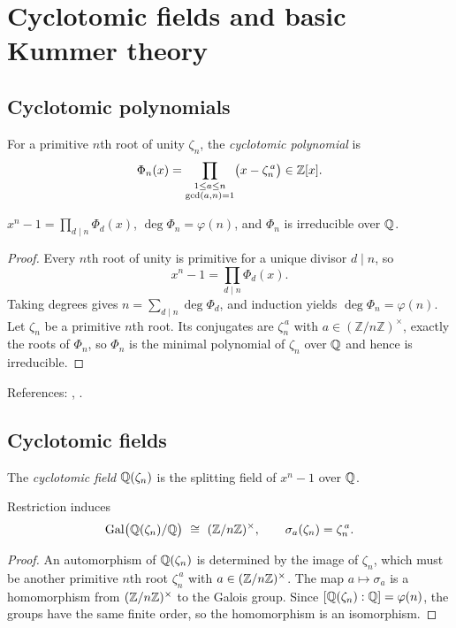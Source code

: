 \section{Cyclotomic fields and basic Kummer theory}\label{sec:cyclotomic-kummer}

\subsection{Cyclotomic polynomials}
\begin{definition}
For a primitive $n$th root of unity $\zeta_n$, the \emph{cyclotomic polynomial} is
\[
\Phi_n(x)=\prod_{\substack{1\le a\le n\\ \gcd(a,n)=1}}\bigl(x-\zeta_n^{\,a}\bigr)\in\mathbb{Z}[x].
\]
\end{definition}
\begin{theorem}
$x^n-1=\prod_{d\mid n}\Phi_d(x)$, $\deg\Phi_n=\varphi(n)$, and $\Phi_n$ is irreducible over $\mathbb{Q}$.
\end{theorem}
\begin{proof}
Every $n$th root of unity is primitive for a unique divisor $d\mid n$, so
\[x^n-1=\prod_{d\mid n}\Phi_d(x).\]
Taking degrees gives $n=\sum_{d\mid n}\deg\Phi_d$, and induction yields $\deg\Phi_n=\varphi(n)$. Let $\zeta_n$ be a primitive $n$th root. Its conjugates are $\zeta_n^{\,a}$ with $a\in(\mathbb{Z}/n\mathbb{Z})^\times$, exactly the roots of $\Phi_n$, so $\Phi_n$ is the minimal polynomial of $\zeta_n$ over $\mathbb{Q}$ and hence is irreducible.
\end{proof}
References: \cite[\S13]{DF}, \cite[Ch.~VIII]{Lang}.

\subsection{Cyclotomic fields}
\begin{definition}
The \emph{cyclotomic field} $\mathbb{Q}(\zeta_n)$ is the splitting field of $x^n-1$ over $\mathbb{Q}$.
\end{definition}
\begin{theorem}
Restriction induces
\[
\Gal\bigl(\Q(\zeta_n)/\Q\bigr)\ \cong\ (\Z/n\Z)^\times,\qquad \sigma_a(\zeta_n)=\zeta_n^{\,a}.
\]
\end{theorem}
\begin{proof}
An automorphism of $\mathbb{Q}(\zeta_n)$ is determined by the image of $\zeta_n$, which must be another primitive $n$th root $\zeta_n^{\,a}$ with $a\in(\mathbb{Z}/n\mathbb{Z})^\times$. The map $a\mapsto\sigma_a$ is a homomorphism from $(\mathbb{Z}/n\mathbb{Z})^\times$ to the Galois group. Since $[\mathbb{Q}(\zeta_n):\mathbb{Q}]=\varphi(n)$, the groups have the same finite order, so the homomorphism is an isomorphism.
\end{proof}

